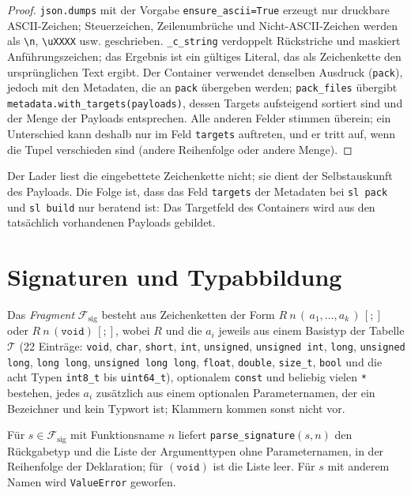 \begin{proof}
	\texttt{json.dumps} mit der Vorgabe \texttt{ensure\_ascii=True} erzeugt nur druckbare ASCII-Zeichen; Steuerzeichen, Zeilenumbrüche und Nicht-ASCII-Zeichen werden als \texttt{\textbackslash n}, \texttt{\textbackslash uXXXX} usw. geschrieben. \texttt{\_c\_string} verdoppelt Rückstriche und maskiert Anführungszeichen; das Ergebnis ist ein gültiges Literal, das als Zeichenkette den ursprünglichen Text ergibt. Der Container verwendet denselben Ausdruck (\texttt{pack}), jedoch mit den Metadaten, die an \texttt{pack} übergeben werden; \texttt{pack\_files} übergibt \texttt{metadata.with\_targets(payloads)}, dessen Targets aufsteigend sortiert sind und der Menge der Payloads entsprechen. Alle anderen Felder stimmen überein; ein Unterschied kann deshalb nur im Feld \texttt{targets} auftreten, und er tritt auf, wenn die Tupel verschieden sind (andere Reihenfolge oder andere Menge).
\end{proof}

Der Lader liest die eingebettete Zeichenkette nicht; sie dient der Selbstauskunft des Payloads. Die Folge ist, dass das Feld \texttt{targets} der Metadaten bei \texttt{sl pack} und \texttt{sl build} nur beratend ist: Das Targetfeld des Containers wird aus den tatsächlich vorhandenen Payloads gebildet.

\section{Signaturen und Typabbildung}

\begin{definition}[Signaturfragment]
	\label{def:fragment}
	Das \emph{Fragment} $\mathcal{F}_{\mathrm{sig}}$ besteht aus Zeichenketten der Form $R\ n\,(\,a_1,\ldots,a_k\,)\,[;]$ oder $R\ n\,(\texttt{void})\,[;]$, wobei $R$ und die $a_i$ jeweils aus einem Basistyp der Tabelle $\mathcal{T}$ (22 Einträge: \texttt{void}, \texttt{char}, \texttt{short}, \texttt{int}, \texttt{unsigned}, \texttt{unsigned int}, \texttt{long}, \texttt{unsigned long}, \texttt{long long}, \texttt{unsigned long long}, \texttt{float}, \texttt{double}, \texttt{size\_t}, \texttt{bool} und die acht Typen \texttt{int8\_t} bis \texttt{uint64\_t}), optionalem \texttt{const} und beliebig vielen \texttt{*} bestehen, jedes $a_i$ zusätzlich aus einem optionalen Parameternamen, der ein Bezeichner und kein Typwort ist; Klammern kommen sonst nicht vor.
\end{definition}

\begin{lemma}
	\label{lem:parse}
	Für $s\in\mathcal{F}_{\mathrm{sig}}$ mit Funktionsname $n$ liefert \texttt{parse\_signature}$(s,n)$ den Rückgabetyp und die Liste der Argumenttypen ohne Parameternamen, in der Reihenfolge der Deklaration; für $(\texttt{void})$ ist die Liste leer. Für $s$ mit anderem Namen wird \texttt{ValueError} geworfen.
\end{lemma}

